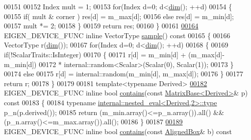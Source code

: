 \begin{DoxyCode}
00151 
00152     Index mult = 1;
00153     \textcolor{keywordflow}{for}(Index d=0; d<\hyperlink{group___geometry___module_ab774df3608d0be913a3aa5d67476a521}{dim}(); ++d)
00154     \{
00155       \textcolor{keywordflow}{if}( mult & corner ) res[d] = m\_max[d];
00156       \textcolor{keywordflow}{else}                res[d] = m\_min[d];
00157       mult *= 2;
00158     \}
00159     \textcolor{keywordflow}{return} res;
00160   \}
00161 
\hyperlink{group___geometry___module_a3cd54685b5378b5e77fa2c62ca7e2797}{00164}   EIGEN\_DEVICE\_FUNC \textcolor{keyword}{inline} VectorType \hyperlink{group___geometry___module_a3cd54685b5378b5e77fa2c62ca7e2797}{sample}()\textcolor{keyword}{ const}
00165 \textcolor{keyword}{  }\{
00166     VectorType r(\hyperlink{group___geometry___module_ab774df3608d0be913a3aa5d67476a521}{dim}());
00167     \textcolor{keywordflow}{for}(Index d=0; d<\hyperlink{group___geometry___module_ab774df3608d0be913a3aa5d67476a521}{dim}(); ++d)
00168     \{
00169       \textcolor{keywordflow}{if}(!ScalarTraits::IsInteger)
00170       \{
00171         r[d] = m\_min[d] + (m\_max[d]-m\_min[d])
00172              * internal::random<Scalar>(Scalar(0), Scalar(1));
00173       \}
00174       \textcolor{keywordflow}{else}
00175         r[d] = internal::random(m\_min[d], m\_max[d]);
00176     \}
00177     \textcolor{keywordflow}{return} r;
00178   \}
00179 
00181   \textcolor{keyword}{template}<\textcolor{keyword}{typename} Derived>
\hyperlink{group___geometry___module_a1882f21e5e56c877ea35505644ef5833}{00182}   EIGEN\_DEVICE\_FUNC \textcolor{keyword}{inline} \textcolor{keywordtype}{bool} \hyperlink{group___geometry___module_a1882f21e5e56c877ea35505644ef5833}{contains}(\textcolor{keyword}{const} \hyperlink{group___core___module_class_eigen_1_1_matrix_base}{MatrixBase<Derived>}& p)\textcolor{keyword}{ const}
00183 \textcolor{keyword}{  }\{
00184     \textcolor{keyword}{typename} \hyperlink{class_eigen_1_1internal_1_1_tensor_lazy_evaluator_writable}{internal::nested\_eval<Derived,2>::type} p\_n(p.derived());
00185     \textcolor{keywordflow}{return} (m\_min.array()<=p\_n.array()).all() && (p\_n.array()<=m\_max.array()).all();
00186   \}
00187 
\hyperlink{group___geometry___module_aadae71332cb6be09f93150edb1b6f99a}{00189}   EIGEN\_DEVICE\_FUNC \textcolor{keyword}{inline} \textcolor{keywordtype}{bool} \hyperlink{group___geometry___module_aadae71332cb6be09f93150edb1b6f99a}{contains}(\textcolor{keyword}{const} \hyperlink{group___geometry___module_class_eigen_1_1_aligned_box}{AlignedBox}& b)\textcolor{keyword}{ const}

\end{DoxyCode}
